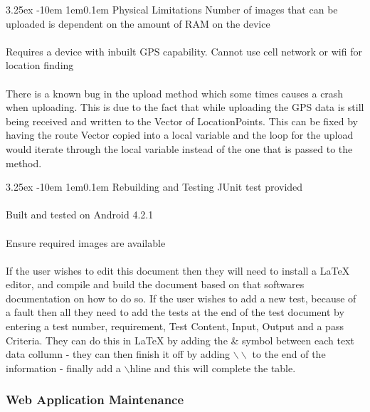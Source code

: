 \documentclass[12pt]{article}
\makeatletter
\renewcommand{\paragraph}{
  \@startsection{paragraph}{4}
  {\z@}{3.25ex \@plus -10em \@minus 1em}{0.1em}
  {\normalfont\normalsize\bfseries}
}
\makeatother
\begin{document}
\paragraph{Physical Limitations}
Number of images that can be uploaded is dependent on the amount of RAM on the device
\\\\
Requires a device with inbuilt GPS capability. Cannot use cell network or wifi for location finding
\\\\
There is a known bug in the upload method which some times causes a crash when uploading. This is due to the fact that while uploading the GPS data is still being received and written to the Vector of LocationPoints. This can be fixed by having the route Vector copied into a local variable and the loop for the upload would iterate through the local variable instead of the one that is passed to the method.
\paragraph{Rebuilding and Testing}
JUnit test provided
\\\\
Built and tested on Android 4.2.1
\\\\
Ensure required images are available
\\\\
 If the user wishes to edit this document then they will need to install a LaTeX editor,  and compile and build the document based on that softwares documentation on how to do so. If the user wishes to add a new test, because of a fault then all they need to add the tests at the end of the test document by entering a test number, requirement, Test Content, Input, Output and a pass Criteria. They can do this in LaTeX by adding the \& symbol between each text data collumn - they can then finish it off by adding $\backslash \backslash$ to the end of the information - finally add a $\backslash$hline and this will complete the table.
\newpage

\subsubsection{Web Application Maintenance}
\end{document}
